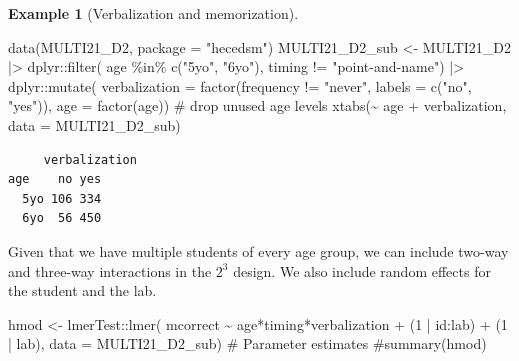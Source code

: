 \documentclass[
  11pt,
  letterpaper,
]{scrbook}
\newenvironment{Shaded}{\begin{snugshade}}{\end{snugshade}}
\newcommand{\AttributeTok}[1]{\textcolor[rgb]{0.40,0.45,0.13}{#1}}
\newcommand{\CommentTok}[1]{\textcolor[rgb]{0.37,0.37,0.37}{#1}}
\newcommand{\DecValTok}[1]{\textcolor[rgb]{0.68,0.00,0.00}{#1}}
\newcommand{\FunctionTok}[1]{\textcolor[rgb]{0.28,0.35,0.67}{#1}}
\newcommand{\NormalTok}[1]{\textcolor[rgb]{0.00,0.23,0.31}{#1}}
\newcommand{\OtherTok}[1]{\textcolor[rgb]{0.00,0.23,0.31}{#1}}
\newcommand{\SpecialCharTok}[1]{\textcolor[rgb]{0.37,0.37,0.37}{#1}}
\newcommand{\StringTok}[1]{\textcolor[rgb]{0.13,0.47,0.30}{#1}}
\theoremstyle{definition}
\newtheorem{example}{Example}[chapter]
\theoremstyle{definition}
\theoremstyle{remark}
\begin{document}
\begin{example}[Verbalization and
memorization]
\begin{Shaded}
\begin{Highlighting}[]
\FunctionTok{data}\NormalTok{(MULTI21\_D2, }\AttributeTok{package =} \StringTok{"hecedsm"}\NormalTok{)}
\NormalTok{MULTI21\_D2\_sub }\OtherTok{\textless{}{-}}\NormalTok{ MULTI21\_D2 }\SpecialCharTok{|\textgreater{}}
\NormalTok{  dplyr}\SpecialCharTok{::}\FunctionTok{filter}\NormalTok{(}
\NormalTok{    age }\SpecialCharTok{\%in\%} \FunctionTok{c}\NormalTok{(}\StringTok{"5yo"}\NormalTok{, }\StringTok{"6yo"}\NormalTok{),}
\NormalTok{    timing }\SpecialCharTok{!=} \StringTok{"point{-}and{-}name"}\NormalTok{) }\SpecialCharTok{|\textgreater{}}
\NormalTok{  dplyr}\SpecialCharTok{::}\FunctionTok{mutate}\NormalTok{(}
    \AttributeTok{verbalization =} \FunctionTok{factor}\NormalTok{(frequency }\SpecialCharTok{!=} \StringTok{"never"}\NormalTok{,}
                           \AttributeTok{labels =} \FunctionTok{c}\NormalTok{(}\StringTok{"no"}\NormalTok{, }\StringTok{"yes"}\NormalTok{)),}
    \AttributeTok{age =} \FunctionTok{factor}\NormalTok{(age)) }\CommentTok{\# drop unused age levels}
\FunctionTok{xtabs}\NormalTok{(}\SpecialCharTok{\textasciitilde{}}\NormalTok{ age }\SpecialCharTok{+}\NormalTok{ verbalization, }\AttributeTok{data =}\NormalTok{ MULTI21\_D2\_sub)}
\end{Highlighting}
\end{Shaded}

\begin{verbatim}
     verbalization
age    no yes
  5yo 106 334
  6yo  56 450
\end{verbatim}

Given that we have multiple students of every age group, we can include
two-way and three-way interactions in the \(2^3\) design. We also
include random effects for the student and the lab.

\begin{Shaded}
\begin{Highlighting}[]
\NormalTok{hmod }\OtherTok{\textless{}{-}}\NormalTok{ lmerTest}\SpecialCharTok{::}\FunctionTok{lmer}\NormalTok{(}
\NormalTok{  mcorrect }\SpecialCharTok{\textasciitilde{}}\NormalTok{ age}\SpecialCharTok{*}\NormalTok{timing}\SpecialCharTok{*}\NormalTok{verbalization }\SpecialCharTok{+}\NormalTok{ (}\DecValTok{1} \SpecialCharTok{|}\NormalTok{ id}\SpecialCharTok{:}\NormalTok{lab) }\SpecialCharTok{+}\NormalTok{ (}\DecValTok{1} \SpecialCharTok{|}\NormalTok{ lab), }
  \AttributeTok{data =}\NormalTok{ MULTI21\_D2\_sub)}
\CommentTok{\# Parameter estimates}
\CommentTok{\#summary(hmod)}
\end{Highlighting}
\end{Shaded}


\end{example}
\end{document}
